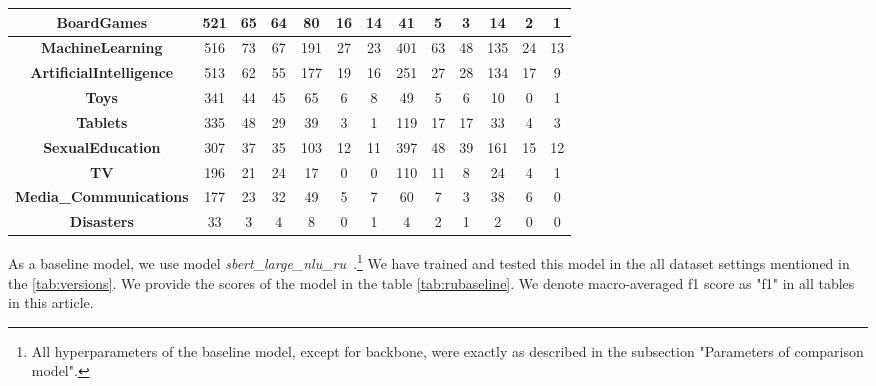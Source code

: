\begin{table}[t]
{\begin{tabular}{|c||c|c|c||c|c|c||c|c|c||c|c|c|}
\textbf{BoardGames} & 521 & 65 & 64 & 80 & 16 & 14 & 41 & 5 & 3 & 14 & 2 & 1\\ \hline
\textbf{MachineLearning} & 516 & 73 & 67 & 191 & 27 & 23 & 401 & 63 & 48 & 135 & 24 & 13\\ \hline
\textbf{ArtificialIntelligence} & 513 & 62 & 55 & 177 & 19 & 16 & 251 & 27 & 28 & 134 & 17 & 9\\ \hline
\textbf{Toys} & 341 & 44 & 45 & 65 & 6 & 8 & 49 & 5 & 6 & 10 & 0 & 1\\ \hline
\textbf{Tablets} & 335 & 48 & 29 & 39 & 3 & 1 & 119 & 17 & 17 & 33 & 4 & 3\\ \hline
\textbf{SexualEducation} & 307 & 37 & 35 & 103 & 12 & 11 & 397 & 48 & 39 & 161 & 15 & 12\\ \hline
\textbf{TV} & 196 & 21 & 24 & 17 & 0 & 0 & 110 & 11 & 8 & 24 & 4 & 1\\ \hline
\textbf{Media\_Communications} & 177 & 23 & 32 & 49 & 5 & 7 & 60 & 7 & 3 & 38 & 6 & 0\\ \hline
\textbf{Disasters} & 33 & 3 & 4 & 8 & 0 & 1 & 4 & 2 & 1 & 2 & 0 & 0\\ \hline
\end{tabular}
}
\end{table}

As a baseline model, we use model \textit{sbert\_large\_nlu\_ru}~\cite{sbert_large_nlu_ru}.\footnote{All hyperparameters of the baseline model, except for backbone, were exactly as described in the subsection "Parameters of comparison model".} We have trained and tested this model in the all dataset settings mentioned in the \ref{tab:versions}. We provide the scores of the model in the table \ref{tab:rubaseline}.  We denote macro-averaged f1 score as "f1" in all tables in this article.

